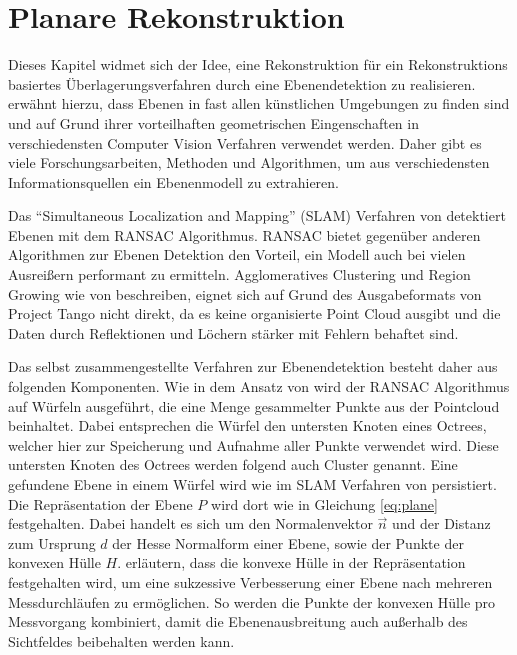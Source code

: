 \section{Planare Rekonstruktion} \label{sec:plane-reconstruction}

Dieses Kapitel widmet sich der Idee, eine Rekonstruktion für ein Rekonstruktions basiertes Überlagerungsverfahren durch eine Ebenendetektion zu realisieren. \citet{yang2010plane} erwähnt hierzu, dass Ebenen in fast allen künstlichen Umgebungen zu finden sind und auf Grund ihrer vorteilhaften geometrischen Eingenschaften in verschiedensten Computer Vision Verfahren verwendet werden. Daher gibt es viele Forschungsarbeiten, Methoden und Algorithmen, um aus verschiedensten Informationsquellen ein Ebenenmodell zu extrahieren.

Das \enquote{Simultaneous Localization and Mapping} (SLAM) Verfahren von \citet{trevor2012planar} detektiert Ebenen mit dem RANSAC Algorithmus. RANSAC bietet gegenüber anderen Algorithmen zur Ebenen Detektion den Vorteil, ein Modell auch bei vielen Ausreißern performant zu ermitteln. Agglomeratives Clustering und Region Growing wie von \citet{feng2014fast} beschreiben, eignet sich auf Grund des Ausgabeformats von Project Tango nicht direkt, da es keine organisierte Point Cloud ausgibt und die Daten durch Reflektionen und Löchern stärker mit Fehlern behaftet sind. 

Das selbst zusammengestellte Verfahren zur Ebenendetektion besteht daher aus folgenden Komponenten. Wie in dem Ansatz von \citet{yang2010plane} wird der RANSAC Algorithmus auf Würfeln ausgeführt, die eine Menge gesammelter Punkte aus der Pointcloud beinhaltet. Dabei entsprechen die Würfel den untersten Knoten eines Octrees, welcher hier zur Speicherung und Aufnahme aller Punkte verwendet wird. Diese untersten Knoten des Octrees werden folgend auch Cluster genannt. Eine gefundene Ebene in einem Würfel wird wie im SLAM Verfahren von \citet{trevor2012planar} persistiert. Die Repräsentation der Ebene \(P\) wird dort wie in Gleichung \ref{eq:plane} festgehalten. Dabei handelt es sich um den Normalenvektor \(\vec{n}\) und der Distanz zum Ursprung \(d\) der Hesse Normalform einer Ebene, sowie der Punkte der konvexen Hülle \(H\). \citet{trevor2012planar} erläutern, dass die konvexe Hülle in der Repräsentation festgehalten wird, um eine sukzessive Verbesserung einer Ebene nach mehreren Messdurchläufen zu ermöglichen. So werden die Punkte der konvexen Hülle pro Messvorgang kombiniert, damit die Ebenenausbreitung auch außerhalb des Sichtfeldes beibehalten werden kann. 

